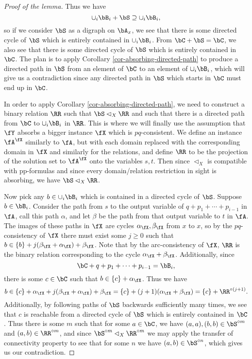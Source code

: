 \begin{proof}[Proof of the lemma]
Thus we have
\[
\cup_i \bB_i + \bS \supseteq \cup_i\bB_i,
\]
so if we consider $\bS$ as a digraph on $\bA_x$, we see that there is some directed cycle of $\bS$ which is entirely contained in $\cup_i \bB_i$. From $\bC + \bS = \bC$, we also see that there is some directed cycle of $\bS$ which is entirely contained in $\bC$. The plan is to apply Corollary \ref{cor-absorbing-directed-path} to produce a directed path in $\bS$ from an element of $\bC$ to an element of $\cup_i \bB_i$, which will give us a contradiction since any directed path in $\bS$ which starts in $\bC$ must end up in $\bC$.

In order to apply Corollary \ref{cor-absorbing-directed-path}, we need to construct a binary relation $\RR$ such that $\bS \lhd_X \RR$ and such that there is a directed path from $\bC$ to $\cup_i \bB_i$ in $\RR$. This is where we will finally use the assumption that $\fY$ absorbs a bigger instance $\fX$ which is $pq$-consistent. We define an instance $\fA^\fX$ similarly to $\fA$, but with each domain replaced with the corresponding domain in $\fX$ and similarly for the relations, and define $\RR$ to be the projection of the solution set to $\fA^\fX$ onto the variables $s,t$. Then since $\lhd_X$ is compatible with pp-formulas and since every domain/relation restriction in sight is absorbing, we have $\bS \lhd_X \RR$.

Now pick any $b \in \cup_i \bB_i$ which is contained in a directed cycle of $\bS$. Suppose $b \in \bB_i$. Consider the path from $s$ to the output variable of $q + p_1 + \cdots + p_{i-1}$ in $\fA$, call this path $\alpha$, and let $\beta$ be the path from that output variable to $t$ in $\fA$. The images of these paths in $\fX$ are cycles $\alpha_\fX, \beta_\fX$ from $x$ to $x$, so by the $pq$-consistency of $\fX$ there must exist some $j \ge 0$ such that $b \in \{b\} + j(\beta_\fX+\alpha_\fX)+\beta_\fX$. Note that by the arc-consistency of $\fX$, $\RR$ is the binary relation corresponding to the cycle $\alpha_\fX+\beta_\fX$. Additionally, since
\[
\bC + q + p_1 + \cdots + p_{i-1} = \bB_i,
\]
there is some $c \in \bC$ such that $b \in \{c\} + \alpha_\fX$. Thus we have
\[
b \in \{c\} + \alpha_\fX + j(\beta_\fX + \alpha_\fX) + \beta_\fX = \{c\} + (j+1)(\alpha_\fX + \beta_\fX) = \{c\} + \RR^{\circ (j+1)}.
\]
Additionally, by following paths of $\bS$ backwards sufficiently many times, we see that $c$ is reachable from a directed cycle of $\bS$ which is entirely contained in $\bC$. Thus there is some $m$ such that for some $a \in \bC$, we have $(a,a), (b,b) \in \bS^{\circ m}$ and $(a,b) \in \RR^{\circ m}$, and since $\bS^{\circ m} \lhd_X \RR^{\circ m}$ we may apply the transfer of connectivity property to see that for some $n$ we have $(a,b) \in \bS^{\circ n}$, which gives us our contradiction.
\end{proof}

